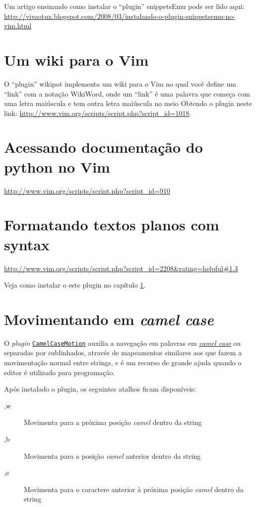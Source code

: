 Um artigo ensinando como instalar o ``plugin'' snippetsEmu pode ser lido aqui:
 \url{http://vivaotux.blogspot.com/2008/03/instalando-o-plugin-snippetsemu-no-vim.html}

\section{Um wiki para o Vim}
\label{sec:Um wiki para o Vim}

O ``plugin'' wikipot implementa um wiki para o Vim no qual você define
um ``link'' com a notação WikiWord, onde um ``link'' é uma palavra que
começa com uma letra maiúscula e tem outra letra maiúscula no meio
Obtendo o plugin neste link: \url{http://www.vim.org/scripts/script.php?script\_id=1018}.

\section{Acessando documentação do python no Vim}\label{Acessando documentação do python no Vim}

 \url{http://www.vim.org/scripts/script.php?script\_id=910}

\section{Formatando textos planos com syntax}
\label{Formatando textos planos com syntax}
\url{http://www.vim.org/scripts/script.php?script\_id=2208&rating=helpful#1.3}

Veja como instalar o este plugin no capítulo \ref{sec:Um wiki para o Vim}.

\section{Movimentando em {\em camel case}}
\label{Movimentando em camel case}

O {\em plugin} \href{http://www.vim.org/scripts/script.php?script_id=1905}{{\tt CamelCaseMotion}}
auxilia a navegação em palavras em \href{http://en.wikipedia.org/wiki/Camel_case}{{\em camel case}}
ou separadas por sublinhados, através de mapeamentos similares aos que fazem a movimentação normal entre 
strings, e é um recurso de grande ajuda quando o editor é utilizado para programação. 

Após instalado o plugin, os seguintes atalhos ficam disponíveis:
\begin{description}
 \item [,w] Movimenta para a próxima posição {\em camel} dentro da string
 \item [,b] Movimenta para a posição {\em camel} anterior dentro da string
 \item [,e] Movimenta para o caractere anterior à próxima posição {\em camel} dentro da string
\end{description}

